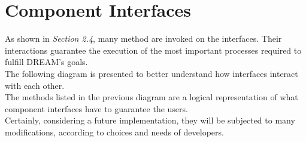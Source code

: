 \section{Component Interfaces}

As shown in \textit{Section 2.4}, many method are invoked on the interfaces. Their interactions guarantee the execution of the most important processes required to fulfill DREAM's goals.\\
The following diagram is presented to better understand how interfaces interact with each other. \\

The methods listed in the previous diagram are a logical representation of what component interfaces have to guarantee the users. \\
Certainly, considering a future implementation, they will be subjected to many modifications, according to choices and needs of developers. 
